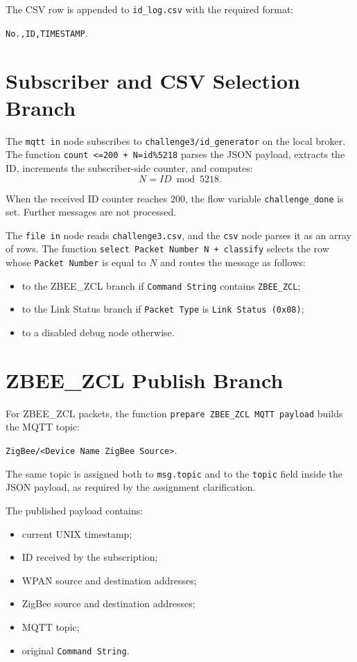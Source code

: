 \documentclass[a4paper,11pt]{article}
\begin{document}
The CSV row is appended to \texttt{id\_log.csv} with the required format:
\begin{center}
  \texttt{No.,ID,TIMESTAMP}.
\end{center}

\section*{Subscriber and CSV Selection Branch}

The \texttt{mqtt in} node subscribes to
\texttt{challenge3/id\_generator} on the local broker. The function
\texttt{count <=200 + N=id\%5218} parses the JSON payload, extracts the ID,
increments the subscriber-side counter, and computes:
\[
  N = ID \bmod 5218.
\]

When the received ID counter reaches 200, the flow variable
\texttt{challenge\_done} is set. Further messages are not processed.

The \texttt{file in} node reads \texttt{challenge3.csv}, and the \texttt{csv}
node parses it as an array of rows. The function
\texttt{select Packet Number N + classify} selects the row whose
\texttt{Packet Number} is equal to $N$ and routes the message as follows:

\begin{itemize}
    \item to the ZBEE\_ZCL branch if \texttt{Command String} contains
    \texttt{ZBEE\_ZCL};
    \item to the Link Status branch if \texttt{Packet Type} is
    \texttt{Link Status (0x08)};
    \item to a disabled debug node otherwise.
\end{itemize}

\section*{ZBEE\_ZCL Publish Branch}

For ZBEE\_ZCL packets, the function \texttt{prepare ZBEE\_ZCL MQTT payload}
builds the MQTT topic:
\begin{center}
  \texttt{ZigBee/<Device Name ZigBee Source>}.
\end{center}

The same topic is assigned both to \texttt{msg.topic} and to the \texttt{topic}
field inside the JSON payload, as required by the assignment clarification.

The published payload contains:

\begin{itemize}
    \item current UNIX timestamp;
    \item ID received by the subscription;
    \item WPAN source and destination addresses;
    \item ZigBee source and destination addresses;
    \item MQTT topic;
    \item original \texttt{Command String}.
\end{itemize}
\end{document}
